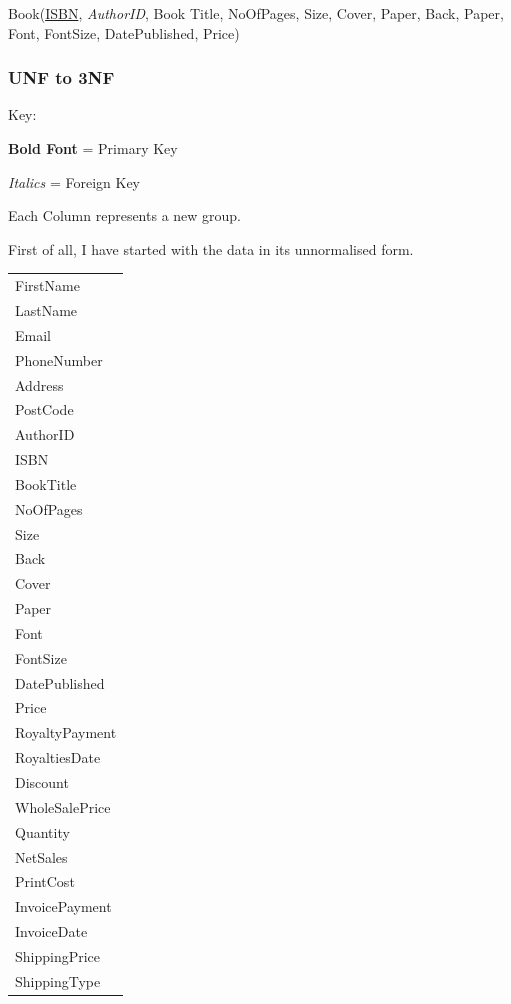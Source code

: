 Book(\underline{ISBN}, \emph{AuthorID}, Book Title, NoOfPages, Size, Cover, Paper, Back, Paper, Font, FontSize, DatePublished, Price)

\subsubsection{UNF to 3NF}

Key:

\textbf{Bold Font} = Primary Key

\emph{Italics} = Foreign Key

Each Column represents a new group.

First of all, I have started with the data in its unnormalised form.

\begin{tabular}{|p{2.5cm}|}
    \hline
    FirstName \\
    LastName \\
    Email \\
    PhoneNumber \\
    Address \\
    PostCode \\
    AuthorID \\
    ISBN \\
    BookTitle \\
    NoOfPages \\
    Size \\
    Back \\
    Cover \\
    Paper \\
    Font \\
    FontSize \\
    DatePublished \\
    Price \\
    RoyaltyPayment \\
    RoyaltiesDate \\
    Discount \\
    WholeSalePrice \\
    Quantity \\
    NetSales \\
    PrintCost \\
    InvoicePayment \\
    InvoiceDate \\
    ShippingPrice \\
    ShippingType \\
    \hline
\end{tabular}

